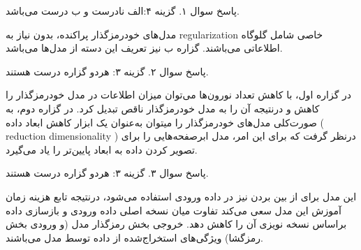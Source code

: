 
\vspace{5cm}
پاسخ سوال ۱. گزینه ۴:‌الف نادرست و ب درست می‌باشد.

مدل‌های خودرمز‌گذار پراکنده، بدون نیاز به regularization خاصی شامل گلوگاه اطلاعاتی می‌باشند. گزاره ب نیز تعریف این دسته از مدل‌ها می‌باشد.

\vspace{1cm}

پاسخ سوال ۲. گزینه ۳:‌ هردو گزاره درست هستند.

در گزاره اول، با کاهش تعداد نورون‌ها می‌توان میزان اطلاعات در مدل خودرمز‌گذار را کاهش و درنتیجه آن را به مدل خودرمزگذار ناقص تبدیل کرد. در گزاره دوم، به صورت‌کلی مدل‌های خودرمزگذار را میتوان به‌عنوان یک ابزار کاهش ابعاد داده ( reduction dimensionality ) درنظر گرفت که برای این امر، مدل ابرصفحه‌هایی را برای تصویر کردن داده به ابعاد پایین‌تر را یاد می‌گیرد.

\vspace{1cm}

پاسخ سوال ۳. گزینه ۳: هردو گزاره درست هستند.

این مدل برای از بین بردن نیز در داده ورودی استفاده می‌شود، درنتیجه تابع هزینه زمان آموزش این مدل سعی می‌کند تفاوت میان نسخه اصلی داده ورودی و بازسازی داده براساس نسخه نویزی آن را کاهش دهد. خروجی بخش رمز‌گذار مدل (و ورودی بخش رمز‌گشا) ویژگی‌های استخراج‌شده از داده توسط مدل می‌باشند.